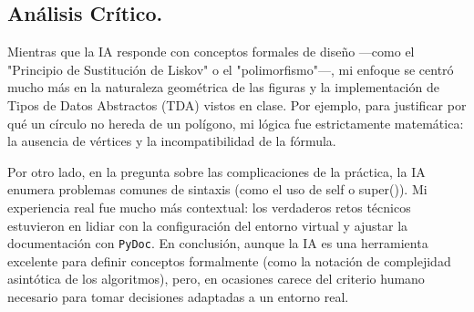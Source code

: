\documentclass[12pt, letterpaper]{article}
\begin{document}
\subsection{Análisis Crítico.}

Mientras que la IA responde con conceptos formales de diseño —como el "Principio de Sustitución de Liskov" o el "polimorfismo"—, mi enfoque se centró mucho más en la naturaleza geométrica de las figuras y la implementación de Tipos de Datos Abstractos (TDA) vistos en clase. Por ejemplo, para justificar por qué un círculo no hereda de un polígono, mi lógica fue estrictamente matemática: la ausencia de vértices y la incompatibilidad de la fórmula.

Por otro lado, en la pregunta sobre las complicaciones de la práctica, la IA enumera problemas comunes de sintaxis (como el uso de self o super()). Mi experiencia real fue mucho más contextual: los verdaderos retos técnicos estuvieron en lidiar con la configuración del entorno virtual y ajustar la documentación con \texttt{PyDoc}. En conclusión, aunque la IA es una herramienta excelente para definir conceptos formalmente (como la notación de complejidad asintótica de los algoritmos), pero, en ocasiones carece del criterio humano necesario para tomar decisiones adaptadas a un entorno real.
\end{document}
